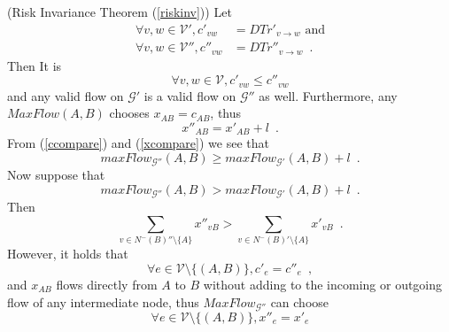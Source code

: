    \begin{sepproof} (Risk Invariance Theorem (\ref{riskinv}))
       Let
       \begin{align*}
          \forall v,w \in \mathcal{V}', c'_{vw} &= DTr'_{v \rightarrow w} \mbox{ and} \\
          \forall v,w \in \mathcal{V}'', c''_{vw} &= DTr''_{v \rightarrow w} \enspace.
       \end{align*}
       Then
       It is
       \begin{equation}
       \label{ccompare}
          \forall v, w \in \mathcal{V}, c'_{vw} \leq c''_{vw}
       \end{equation}
       and any valid flow on $\mathcal{G}'$ is a valid flow on $\mathcal{G}''$ as well. Furthermore, any
       $MaxFlow\left(A, B\right)$ chooses $x_{AB} = c_{AB}$, thus
       \begin{equation}
       \label{xcompare}
          x''_{AB} = x'_{AB} + l \enspace.
       \end{equation}
       From (\ref{ccompare}) and (\ref{xcompare}) we see that
       \begin{equation}
       \label{doublebigger}
          maxFlow_{\mathcal{G}''}\left(A, B\right) \geq maxFlow_{\mathcal{G}'}\left(A, B\right) + l \enspace.
       \end{equation}
       Now suppose that
       \begin{equation}
       \label{mfsupposition}
          maxFlow_{\mathcal{G}''}\left(A, B\right) > maxFlow_{\mathcal{G}'}\left(A, B\right) + l \enspace.
       \end{equation}
       Then 
       \begin{equation*}
          \sum\limits_{v \in N^{-}\left(B\right)'' \setminus \{A\}}x''_{vB} > \sum\limits_{v \in N^{-}\left(B\right)'
          \setminus \{A\}}x'_{vB} \enspace.
       \end{equation*}
       However, it holds that
       \begin{equation}
       \label{cequal}
          \forall e \in \mathcal{V} \setminus \{\left(A, B\right)\}, c'_e = c''_e \enspace,
       \end{equation}
       and $x_{AB}$ flows directly from $A$ to $B$ without adding to the incoming or outgoing flow of any intermediate node,
       thus $MaxFlow_{\mathcal{G}''}$ can choose
       \begin{equation*}
          \forall e \in \mathcal{V} \setminus \{\left(A, B\right)\}, x''_e = x'_e
       \end{equation*}

\end{sepproof}
